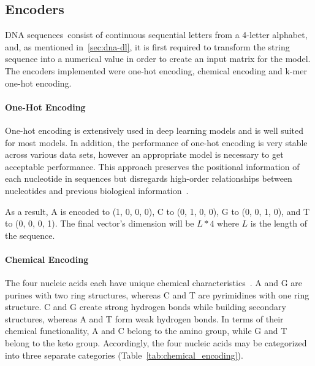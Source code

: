 \subsection{Encoders}

\gls{DNA} sequences consist of continuous sequential letters from a 4-letter alphabet, and, as mentioned in~\ref{sec:dna-dl}, it is first required to transform the string sequence into a numerical value in order to create an input matrix for the model. The encoders implemented were one-hot encoding, chemical encoding and k-mer one-hot encoding.

\paragraph{One-Hot Encoding}

One-hot encoding is extensively used in deep learning models and is well suited for most models. In addition, the performance of one-hot encoding is very stable across various data sets, however an appropriate model is necessary to get acceptable performance. This approach preserves the positional information of each nucleotide in sequences but disregards high-order relationships between nucleotides and previous biological information~\cite{Zhang2019ModelingNetwork}.

As a result, \gls{A} is encoded to (1, 0, 0, 0), \gls{C} to (0, 1, 0, 0), \gls{G} to (0, 0, 1, 0), and \gls{T} to (0, 0, 0, 1). The final vector's dimension will be $L * 4$ where $L$ is the length of the sequence.

\paragraph{Chemical Encoding}

The four nucleic acids each have unique chemical characteristics~\cite{GolamBari2013DNASequence}. \gls{A} and \gls{G} are purines with two ring structures, whereas \gls{C} and \gls{T} are pyrimidines with one ring structure. \gls{C} and \gls{G} create strong hydrogen bonds while building secondary structures, whereas \gls{A} and \gls{T} form weak hydrogen bonds. In terms of their chemical functionality, \gls{A} and \gls{C} belong to the amino group, while \gls{G} and \gls{T} belong to the keto group. Accordingly, the four nucleic acids may be categorized into three separate categories (Table~\ref{tab:chemical_encoding}).


